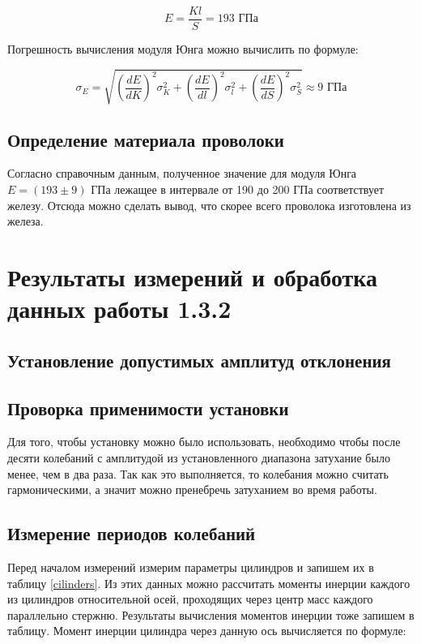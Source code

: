 \documentclass[a4paper,12pt]{article}
\begin{document}
\begin{equation}
    E = \frac{K l}{S} = 193 \text{ ГПа}
\end{equation}

Погрешность вычисления модуля Юнга можно вычислить по формуле:

\begin{equation}
    \sigma_E = \sqrt{
    \left( \frac{dE}{dK} \right)^2 \sigma_{K}^2 +
    \left( \frac{dE}{dl} \right)^2 \sigma_{l}^2 +
    \left( \frac{dE}{dS} \right)^2 \sigma_{S}^2
    } \approx 9 \text{ ГПа}
\end{equation}

\subsection{Определение материала проволоки}

Согласно справочным данным, полученное значение для модуля Юнга $E = (193 \pm 9)$ ГПа лежащее в интервале от 190 до 200 ГПа соответствует железу. Отсюда можно сделать вывод, что скорее всего проволока изготовлена из железа.

\section{Результаты измерений и обработка данных работы 1.3.2}

\subsection{Установление допустимых амплитуд отклонения}


\subsection{Проворка применимости установки}

Для того, чтобы установку можно было использовать, необходимо чтобы после десяти колебаний с амплитудой из установленного диапазона затухание было менее, чем в два раза. Так как это выполняется, то колебания можно считать гармоническими, а значит можно пренебречь затуханием во время работы.

\subsection{Измерение периодов колебаний}

Перед началом измерений измерим параметры цилиндров и запишем их в таблицу \ref{cilinders}. Из этих данных можно рассчитать моменты инерции каждого из цилиндров относительной осей, проходящих через центр масс каждого параллельно стержню. Результаты вычисления моментов инерции тоже запишем в таблицу. Момент инерции цилиндра через данную ось вычисляется по формуле:
\end{document}
